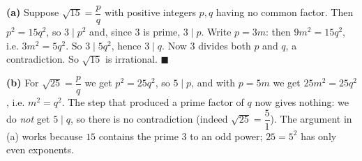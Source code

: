 \textbf{(a)} Suppose $\sqrt{15}=\dfrac pq$ with positive integers $p,q$ having no common factor. Then $p^2=15q^2$, so $3\mid p^2$ and, since $3$ is prime, $3\mid p$. Write $p=3m$: then $9m^2=15q^2$, i.e. $3m^2=5q^2$. So $3\mid5q^2$, hence $3\mid q$. Now $3$ divides both $p$ and $q$, a contradiction. So $\sqrt{15}$ is irrational. $\blacksquare$

\textbf{(b)} For $\sqrt{25}=\dfrac pq$ we get $p^2=25q^2$, so $5\mid p$, and with $p=5m$ we get $25m^2=25q^2$, i.e. $m^2=q^2$. The step that produced a prime factor of $q$ now gives nothing: we do \emph{not} get $5\mid q$, so there is no contradiction (indeed $\sqrt{25}=\dfrac51$). The argument in (a) works because $15$ contains the prime $3$ to an odd power; $25=5^2$ has only even exponents.
